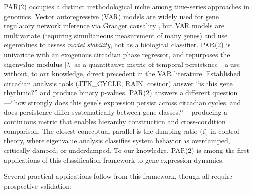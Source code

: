 \documentclass[11pt,letterpaper]{article}
\begin{document}
PAR(2) occupies a distinct methodological niche among time-series approaches in genomics. Vector autoregressive (VAR) models are widely used for gene regulatory network inference via Granger causality \citep{fujita2007}, but VAR models are multivariate (requiring simultaneous measurement of many genes) and use eigenvalues to assess \textit{model stability}, not as a biological classifier. PAR(2) is univariate with an exogenous circadian phase regressor, and repurposes the eigenvalue modulus $|\lambda|$ as a quantitative metric of temporal persistence---a use without, to our knowledge, direct precedent in the VAR literature. Established circadian analysis tools (JTK\_CYCLE, RAIN, cosinor) answer ``is this gene rhythmic?'' and produce binary p-values. PAR(2) answers a different question---``how strongly does this gene's expression persist across circadian cycles, and does persistence differ systematically between gene classes?''---producing a continuous metric that enables hierarchy construction and cross-condition comparison. The closest conceptual parallel is the damping ratio ($\zeta$) in control theory, where eigenvalue analysis classifies system behavior as overdamped, critically damped, or underdamped. To our knowledge, PAR(2) is among the first applications of this classification framework to gene expression dynamics.

Several practical applications follow from this framework, though all require prospective validation:
\end{document}
